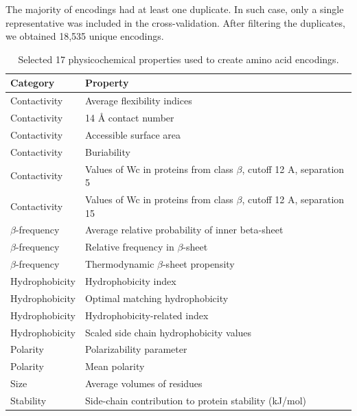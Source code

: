 \documentclass[a4,center,fleqn]{NAR}
\begin{document}
  The majority of encodings had at least one duplicate. In such case, only a 
single representative was included in the cross-validation. After filtering the 
duplicates, we obtained 18,535 unique encodings.

\begin{table}[bth]
\caption{Selected 17 physicochemical properties used to create amino acid encodings.} 
\label{tab:properties}
\small
\begin{tabularx}{\columnwidth}{@{} lX @{}}
  \toprule
  Category & Property \\ 
  \midrule
  Contactivity & Average flexibility indices \citep{bhaskaran_positional_1988} 
\\ 
  \rowcolor[gray]{0.85}Contactivity & 14 {\AA} contact number 
\citep{nishikawa_radial_1986} \\ 
  Contactivity & Accessible surface area \citep{radzicka_comparing_1988} \\ 
  \rowcolor[gray]{0.85}Contactivity & Buriability \citep{zhou_quantifying_2004} 
\\ 
  Contactivity & Values of Wc in proteins from class $\beta$, \newline  cutoff 
12 A, separation 5 \citep{wozniak_characteristics_2014} \\ 
  \rowcolor[gray]{0.85}Contactivity & Values of Wc in proteins from class 
$\beta$, \newline  cutoff 12 A, separation 15 
\citep{wozniak_characteristics_2014} \\ 
\hline 
  $\beta$-frequency & Average relative probability of inner \newline beta-sheet 
\citep{kanehisa_local_1980} \\ 
  \rowcolor[gray]{0.85}$\beta$-frequency & Relative frequency in $\beta$-sheet 
\citep{prabhakaran_distribution_1990} \\ 
  $\beta$-frequency & Thermodynamic $\beta$-sheet propensity 
\citep{kim_thermodynamic_1993} \\ 
\hline 
 \rowcolor[gray]{0.85} Hydrophobicity & Hydrophobicity index 
\citep{argos_structural_1982} \\ 
  Hydrophobicity & Optimal matching hydrophobicity 
\citep{sweet_correlation_1983} \\ 
  \rowcolor[gray]{0.85}Hydrophobicity & Hydrophobicity-related index 
\citep{kidera_statistical_1985} \\ 
  Hydrophobicity & Scaled side chain hydrophobicity values 
\citep{black_development_1991} \\ 
\hline 
  \rowcolor[gray]{0.85}Polarity & Polarizability parameter 
\citep{charton_structural_1982} \\
  Polarity & Mean polarity \citep{radzicka_comparing_1988} \\ 
  \hline 
  \rowcolor[gray]{0.85}Size & Average volumes of residues 
\citep{pontius_deviations_1996} \\ 
\hline 
  Stability & Side-chain contribution to protein stability (kJ/mol) 
\citep{takano_new_2001} \\
  \bottomrule
\end{tabularx}

\end{table}
\end{document}
